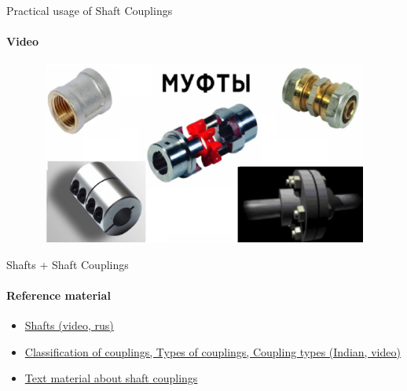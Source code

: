 \documentclass[aspectratio=169]{beamer}
\begin{document}
\begin{frame}[t]{Practical usage of Shaft Couplings}
    \framesubtitle{Video}
    \vspace{-0.6cm}
    \begin{figure}[H]
        \href{https://youtu.be/q1bkBPtqEZw?t=178}{
            \centering\includegraphics[height=6cm,width=1\textwidth,keepaspectratio]{muft_video.jpg}}
        \label{fig:muft_video.jpg}
    \end{figure}
\end{frame}

\begin{frame}[t]{Shafts + Shaft Couplings}
\framesubtitle{Reference material}
    \begin{itemize}
        \item \href{https://youtu.be/hm3V2G5VfWk}{Shafts (video, rus)}
        \item \href{https://youtu.be/PBasimGAhJw}{Classification of couplings, Types of couplings, Coupling types (Indian, video)}
        \item \href{https://engineeringlearn.com/shaft-coupling-definition-types-uses-working-principle-advantages-complete-guide/}{Text material about shaft couplings}
    \end{itemize}
\end{frame}
\end{document}
